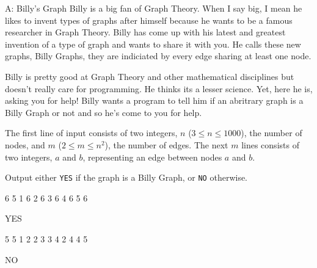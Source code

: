 \begin{problem}{A: Billy's Graph}
Billy is a big fan of Graph Theory.
When I say big, I mean he likes to invent types of graphs after himself because he wants to be a famous researcher in Graph Theory.
Billy has come up with his latest and greatest invention of a type of graph and wants to share it with you.
He calls these new graphs, Billy Graphs, they are indiciated by every edge sharing at least one node.

Billy is pretty good at Graph Theory and other mathematical disciplines but doesn't really care for programming.
He thinks its a lesser science.
Yet, here he is, asking you for help!
Billy wants a program to tell him if an abritrary graph is a Billy Graph or not and so he's come to you for help.
\end{problem}

\begin{formalin}
The first line of input consists of two integers, $n$ ($3 \leq n \leq 1000$), the number of nodes, and $m$ ($2 \leq m \leq n^2$), the number of edges.
The next $m$ lines consists of two integers, $a$ and $b$, representing an edge between nodes $a$ and $b$.
\end{formalin}

\begin{formalout}
Output either \texttt{YES} if the graph is a Billy Graph, or \texttt{NO} otherwise. 
\end{formalout}

\begin{datain}
6 5
1 6
2 6
3 6
4 6
5 6
\end{datain}
\begin{dataout}
YES
\end{dataout}

\begin{datain}
5 5
1 2
2 3
3 4
2 4
4 5
\end{datain}
\begin{dataout}
NO
\end{dataout}
